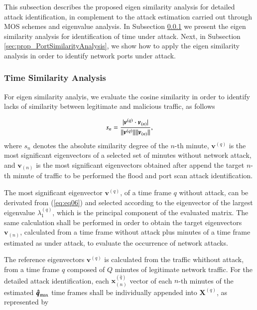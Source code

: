 \documentclass[review]{elsarticle}
\DeclarePairedDelimiter\abs{\lvert}{\rvert}%
\DeclarePairedDelimiter\norm{\lVert}{\rVert}%
\begin{document}
This subsection describes the proposed eigen similarity analysis for detailed attack identification, in complement to the attack estimation carried out through MOS schemes and eigenvalue analysis. In Subsection \ref{sec:prop_TimeSimilarityAnalysis} we present the eigen similarity analysis for identification of time under attack. Next, in Subsection \ref{sec:prop_PortSimilarityAnalysis}, we show how to apply the eigen similarity analysis in order to identify network ports under attack.

\subsubsection{Time Similarity Analysis}
\label{sec:prop_TimeSimilarityAnalysis}

For eigen similarity analyis, we evaluate the cosine similarity in order to identify lacks of similarity between legitimate and malicious traffic, as follows

\begin{equation}\label{eq:eq11}
s_n = \frac{\abs{\boldsymbol{v}^{(q)} \cdot \boldsymbol{v}_{(n)}}}{\norm{\boldsymbol{v}^{(q)}}\norm{\boldsymbol{v}_{(n)}}},
\end{equation}
where $s_n$ denotes the absolute similarity degree of the $n$-th minute, $\boldsymbol{v}^{(q)}$ is the most significant eigenvectors of a selected set of minutes without network attack, and $\boldsymbol{v}_{(n)}$ is the most significant eigenvectors obtained after append the target $n$-th minute of traffic to be performed the flood and port scan attack identification.

The most significant eigenvector $\boldsymbol{v}^{(q)}$, of a time frame $q$ without attack, can be derivated from (\ref{eq:eq06}) and selected according to the eigenvector of the largest eigenvalue $\lambda_1^{(q)}$, which is the principal component of the evaluated matrix. The same calculation shall be performed in order to obtain the target eigenvectors $\boldsymbol{v}_{(n)}$, calculated from a time frame without attack plus minutes of a time frame estimated as under attack, to evaluate the occurrence of network attacks. 

The reference eigenvectors $\boldsymbol{v}^{(q)}$ is calculated from the traffic whithout attack, from a time frame $q$ composed of $Q$ minutes of legitimate network traffic. For the detailed attack identification, each $\boldsymbol{x}^{(\hat{q})}_{(n)}$ vector of each $n$-th minutes of the estimated $\rm{\boldsymbol{\hat{q}}}_{\rm max}$ time frames shall be individually appended into $\boldsymbol{X}^{(q)}$, as represented by
\end{document}
